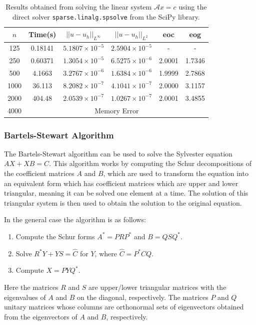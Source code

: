 \documentclass[11pt]{article}
\numberwithin{equation}{section}
\begin{document}
\begin{table}[H]
\centering
\begin{tabular}{|c|c|c|c|c|c|}
\hline
$n$ & Time(s) & $|| u - u_h ||_{L^{\infty}}$ &$|| u - u_h ||_{L^{2}}$ & eoc & eog \\
\hline
125 & 0.18141 & $5.1807 \times 10^{-5}$ & $2.5904 \times 10^{-5}$ & - & - \\
250 & 0.60371 & $1.3054 \times 10^{-5}$ & $6.5275 \times 10^{-6}$ & 2.0001 & 1.7346 \\
500 & 4.1663 & $3.2767 \times 10^{-6}$ & $1.6384 \times 10^{-6}$ & 1.9999 & 2.7868 \\
1000 & 36.113 & $8.2082 \times 10^{-7}$ & $4.1041 \times 10^{-7}$ & 2.0000 & 3.1157 \\
2000 & 404.48 & $2.0539 \times 10^{-7}$ & $1.0267 \times 10^{-7}$ & 2.0001 & 3.4855 \\
\cline{2-6}
4000 & \multicolumn{5}{c|}{Memory Error} \\
\hline
\end{tabular}
\captionsetup{justification=centering}
\caption{Results obtained from solving the linear system $\mathcal{A} x = c$ using the direct solver  \texttt{sparse.linalg.spsolve} from the SciPy library.}
\label{table:kron direct}
\end{table}

\subsubsection{Bartels-Stewart Algorithm}
The Bartels-Stewart algorithm \cite{Bartels} can be used to solve the Sylvester equation $AX + XB = C$. 
This algorithm works by computing the Schur decompositions of the coefficient matrices $A$ and $B$, which are used to transform the equation into an equivalent form which has coefficient matrices which are upper and lower triangular, meaning it can be solved one element at a time. The solution of this triangular system is then used to obtain the solution to the original equation.

In the general case the algorithm is as follows:
\begin{enumerate}
\item Compute the Schur forms $A^* = PRP^*$ and $B=QSQ^*$.
\item Solve $R^*Y + YS = \hat{C}$ for $Y$, where $\hat{C} = P^*CQ$.
\item Compute $X=PYQ^*$.
\end{enumerate}
Here the matrices $R$ and $S$ are upper/lower triangular matrices with the eigenvalues of $A$ and $B$ on the diagonal, respectively. The matrices $P$ and $Q$ unitary matrices whose columns are orthonormal sets of eigenvectors obtained from the eigenvectors of $A$ and $B$, respectively.
\end{document}
